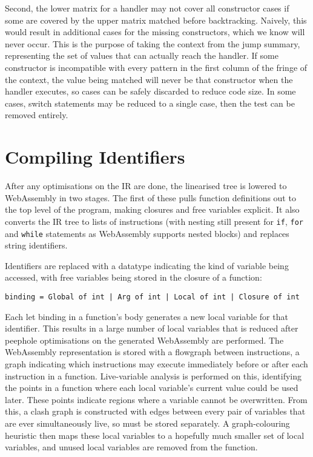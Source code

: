 Second, the lower matrix for a handler may not cover all constructor cases if some are covered by the upper matrix matched before backtracking. Naively, this would result in additional cases for the missing constructors, which we know will never occur. This is the purpose of taking the context from the jump summary, representing the set of values that can actually reach the handler. If some constructor is incompatible with every pattern in the first column of the fringe of the context, the value being matched will never be that constructor when the handler executes, so cases can be safely discarded to reduce code size. In some cases, switch statements may be reduced to a single case, then the test can be removed entirely.



\section{Compiling Identifiers}
After any optimisations on the IR are done, the linearised tree is lowered to WebAssembly in two stages. The first of these pulls function definitions out to the top level of the program, making closures and free variables explicit. It also converts the IR tree to lists of instructions (with nesting still present for \verb|if|, \verb|for| and \verb|while| statements as WebAssembly supports nested blocks) and replaces string identifiers.


Identifiers are replaced with a datatype indicating the kind of variable being accessed, with free variables being stored in the closure of a function:

\verb"binding = Global of int | Arg of int | Local of int | Closure of int"

Each let binding in a function's body generates a new local variable for that identifier. This results in a large number of local variables that is reduced after peephole optimisations on the generated WebAssembly are performed. 
The WebAssembly representation is stored with a flowgraph between instructions, a graph indicating which instructions may execute immediately before or after each instruction in a function. 
Live-variable analysis is performed on this, identifying the points in a function where each local variable's current value could be used later. These points indicate regions where a variable cannot be overwritten. From this, a clash graph is constructed with edges between every pair of variables that are ever simultaneously live, so must be stored separately. A graph-colouring heuristic then maps these local variables to a hopefully much smaller set of local variables, and unused local variables are removed from the function.

